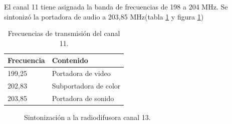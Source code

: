 \documentclass[../../labo_tp5_main.tex]{subfiles}
\begin{document}
El canal 11 tiene asignada la banda de frecuencias de 198 a 204 MHz. Se sintoniz\'o la portadora de audio a 203,85 MHz(tabla \ref{tab:canal11} y figura \ref{imagen})

\begin{table}[H]
\centering
\begin{tabular}{|l|l|}
\hline
Frecuencia & Contenido             \\ \hline
199,25     & Portadora de video    \\ \hline
202,83     & Subportadora de color \\ \hline
203,85     & Portadora de sonido   \\ \hline
\end{tabular}
\caption{Frecuencias de transmisi\'on del canal 11.}
\label{tab:canal11}
\end{table}

\begin{figure}[H]
	\centering
	\caption{Sintonizaci\'on a la radiodifusora canal 13.}
	\label{imagen}
\end{figure}
\end{document}
